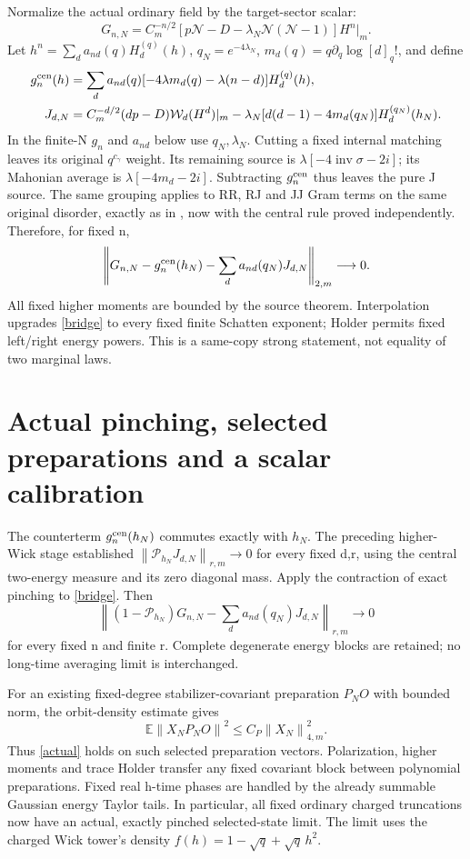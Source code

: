 \documentclass[11pt]{article}
\newcommand{\E}{\mathbb E}
\newcommand{\Wick}{\mathcal W}
\newcommand{\norm}[1]{\left\lVert#1\right\rVert}
\begin{document}
Normalize the actual ordinary field by the target-sector scalar:
\[
 G_{n,N}=C_m^{-n/2}
 [p\mathcal N-D-\lambda_N\mathcal N(\mathcal N-1)]H^n|_m.
\]
Let $h^n=\sum_d a_{nd}(q)H_d^{(q)}(h)$, $q_N=e^{-4\lambda_N}$,
$m_d(q)=q\partial_q\log[d]_q!$, and define
\begin{align*}
 g_n^{\rm cen}(h)&=\sum_d a_{nd}(q)
     [-4\lambda m_d(q)-\lambda(n-d)]H_d^{(q)}(h),\\
 J_{d,N}&=C_m^{-d/2}(dp-D)\Wick_d(H^d)|_m
 -\lambda_N[d(d-1)-4m_d(q_N)]H_d^{(q_N)}(h_N).
\end{align*}
In the finite-N $g_n$ and $a_{nd}$ below use $q_N,\lambda_N$.
Cutting a fixed internal matching leaves its original $q^{c_\gamma}$
weight. Its remaining source is
$\lambda[-4\operatorname{inv}\sigma-2i]$; its Mahonian average is
$\lambda[-4m_d-2i]$. Subtracting $g_n^{\rm cen}$ thus leaves the
pure J source. The same grouping applies to RR, RJ and JJ Gram terms
on the same original disorder, exactly as in \cite{joint}, now with
the central rule proved independently. Therefore, for fixed n,
\begin{equation}
 \left\|G_{n,N}-g_n^{\rm cen}(h_N)
       -\sum_d a_{nd}(q_N)J_{d,N}\right\|_{2,m}\longrightarrow0.
 \label{bridge}
\end{equation}
All fixed higher moments are bounded by the source theorem. Interpolation
upgrades \eqref{bridge} to every fixed finite Schatten exponent;
Holder permits fixed left/right energy powers. This is a same-copy
strong statement, not equality of two marginal laws.

\newpage
\section{Actual pinching, selected preparations and a scalar calibration}
The counterterm $g_n^{\rm cen}(h_N)$ commutes exactly with $h_N$.
The preceding higher-Wick stage \cite{higher} established
$\norm{\mathcal P_{h_N}J_{d,N}}_{r,m}\to0$ for every fixed d,r,
using the central two-energy measure and its zero diagonal mass.
Apply the contraction of exact pinching to \eqref{bridge}. Then
\begin{equation}
 \left\|(1-\mathcal P_{h_N})G_{n,N}
       -\sum_d a_{nd}(q_N)J_{d,N}\right\|_{r,m}\longrightarrow0
 \label{actual}
\end{equation}
for every fixed n and finite r. Complete degenerate energy blocks are
retained; no long-time averaging limit is interchanged.

For an existing fixed-degree stabilizer-covariant preparation $P_NO$
with bounded norm, the orbit-density estimate \cite{prep} gives
\[
 \E\norm{X_NP_NO}^2\le C_P\norm{X_N}_{4,m}^2.
\]
Thus \eqref{actual} holds on such selected preparation vectors.
Polarization, higher moments and trace Holder transfer any fixed
covariant block between polynomial preparations. Fixed real h-time
phases are handled by the already summable Gaussian energy Taylor
tails. In particular, all fixed ordinary charged truncations now have
an actual, exactly pinched selected-state limit. The limit uses the
charged Wick tower's density $f(h)=1-\sqrt q+\sqrt q\,h^2$.
\end{document}
